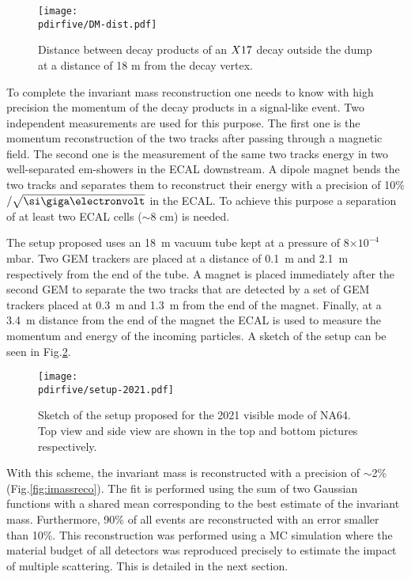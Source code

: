 \begin{figure}[tbh!]
  \centering
  \texttt{[image: \\pdirfive/DM-dist.pdf]}
  \caption[Distance of the decay products of X17 in the 2021 setup]{Distance between decay products of an $X17$ decay outside the dump at a distance of 18 m from the decay vertex.}
  \label{fig:dm_dist1}
\end{figure}

To complete the invariant mass reconstruction one needs to know with high precision the momentum of the decay products in a signal-like event. Two independent measurements are used for this purpose. The first one is the momentum reconstruction of the two tracks after passing through a magnetic field. The second one is the measurement of the same two tracks energy in two well-separated em-showers in the ECAL downstream. A dipole magnet bends the two tracks and separates them to reconstruct their energy with a precision of 10\%$/\sqrt{\gev}$ in the ECAL. To achieve this purpose a separation of at least two ECAL cells ($\sim 8$ \si{\centi\meter}) is needed.

The setup proposed uses an \SI{18}{\meter} vacuum tube kept at a pressure of 8$\times 10^{-4}$ \si{\milli\bar}. Two GEM trackers \cite{gem} are placed at a distance of \SI{0.1}{\meter} and \SI{2.1}{\meter} respectively from the end of the tube. A magnet is placed immediately after the second GEM to separate the two tracks that are detected by a set of GEM trackers placed at \SI{0.3}{\meter} and \SI{1.3}{\meter} from the end of the magnet. Finally, at a \SI{3.4}{\meter} distance from the end of the magnet the ECAL is used to measure the momentum and energy of the incoming particles. A sketch of the setup can be seen in Fig.\ref{fig:setup-2021}.

\begin{figure}[tbh!]
  \centering
  \texttt{[image: \\pdirfive/setup-2021.pdf]}
  \caption[2021 setup]{Sketch of the setup proposed for the 2021 visible mode of NA64. Top view and side view are shown in the top and bottom pictures respectively.}
  \label{fig:setup-2021}
\end{figure}

With this scheme, the invariant mass is reconstructed with a precision of $\sim$2\% (Fig.\ref{fig:imassreco}). The fit is performed using the sum of two Gaussian functions with a shared mean corresponding to the best estimate of the invariant mass. Furthermore, 90\% of all events are reconstructed with an error smaller than 10\%. This reconstruction was performed using a MC simulation where the material budget of all detectors was reproduced precisely to estimate the impact of multiple scattering. This is detailed in the next section.

